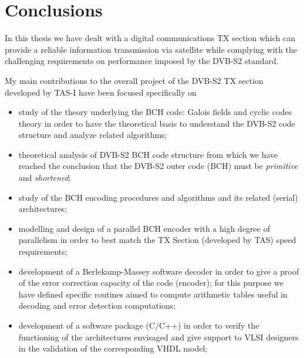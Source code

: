 \chapter{Conclusions} \label{ch:Conclusions}

In this thesis we have dealt with a digital communications TX section which can provide a reliable information transmission via satellite while complying with the challenging requirements on performance imposed by the DVB-S2 standard.

My main contributions to the overall project of the DVB-S2 TX section developed by TAS-I have been focused specifically on
\begin{itemize}
\item study of the theory underlying the BCH code: Galois fields and cyclic codes theory in order to have the theoretical basis to understand the DVB-S2 code structure and analyze related algorithms;
\item theoretical analysis of DVB-S2 BCH code structure from which we have reached the conclusion that the DVB-S2 outer code (BCH) must be \emph{primitive} and \emph{shortened};
\item study of the BCH encoding procedures and algorithms and its related (serial) architectures;
\item modelling and design of a parallel BCH encoder with a high degree of parallelism in order to best match the TX Section (developed by TAS) speed requirements;
\item development of a Berlekamp-Massey software decoder in order to give a proof of the error correction capacity of the code (encoder); for this purpose we have defined specific routines aimed to compute arithmetic tables useful in decoding and error detection computations;
\item development of a software package (C/C++) in order to verify the functioning of the architectures envisaged and give support to VLSI designers in the validation of the corresponding VHDL model;
\end{itemize}

